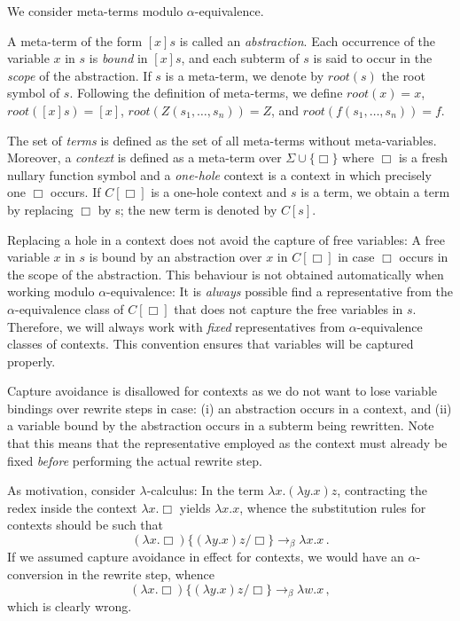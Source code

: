 \documentclass{LMCS}
\theoremstyle{plain}
\theoremstyle{definition}
\newcommand{\rew}{\rightarrow}
\newcommand{\rs}[1]{root(#1)}
\begin{document}
\noindent We consider meta-terms modulo $\alpha$-equivalence.

A meta-term of the form $[x] s$ is called an
\emph{abstraction}. Each occurrence of the variable $x$ in $s$ is
\emph{bound} in $[x]s$, and each subterm of $s$ is said to occur in the
\emph{scope} of the abstraction. If $s$ is a meta-term, we denote by $\rs{s}$ the root symbol of $s$. Following the definition of meta-terms, we define $\rs{x} = x$, $\rs{[x]s} = [x]$, $\rs{Z(s_1, \ldots, s_n)} = Z$, and $\rs{f(s_1, \ldots, s_n)} = f$.

The set of \emph{terms} is defined as the set of all meta-terms without meta-variables. Moreover, a \emph{context} is defined as a meta-term over $\Sigma \cup \{ \Box \}$ where $\Box$ is a fresh nullary function symbol and a \emph{one-hole} context is a context in which precisely one $\Box$ occurs. If $C[\Box]$ is a one-hole context and $s$ is a term, we obtain a term by replacing $\Box$ by s; the new term is denoted by $C[s]$.

Replacing a hole in a context does not avoid the capture of free variables: A free variable $x$ in $s$ is bound by an abstraction over $x$ in $C[\Box]$ in case $\Box$ occurs in the scope of the abstraction. This behaviour is not obtained automatically when working modulo $\alpha$-equivalence: It is \emph{always} possible find a representative from the $\alpha$-equivalence class of $C[\Box]$ that does not capture the free variables in $s$. Therefore, we will always work with \emph{fixed} representatives from $\alpha$-equivalence classes of contexts. This convention ensures that variables will be captured properly.

\begin{rem}
Capture avoidance is disallowed for contexts as we do not want to lose variable bindings over rewrite steps in case: (i) an abstraction occurs in a context, and (ii) a variable bound by the abstraction occurs in a subterm being rewritten. Note that this means that the representative employed as the context must already be fixed \emph{before} performing the actual rewrite step.

As motivation, consider $\lambda$-calculus: In the term
$\lambda x . (\lambda y . x) z$, contracting the redex 
inside the context $\lambda x . \Box$ yields
$\lambda x.x$, whence the substitution rules for contexts should
be such that 
\[
(\lambda x. \Box)\{(\lambda y . x) z / \Box\}
\rew_\beta \lambda x.x \, .
\]
 If we assumed capture avoidance
in effect for contexts, we would have an $\alpha$-conversion
in the rewrite step, whence
\[
(\lambda x .\Box)\{(\lambda y . x) z / \Box\}
\rew_\beta \lambda w . x \, ,
\]
which is clearly wrong.
\end{rem}
\end{document}
